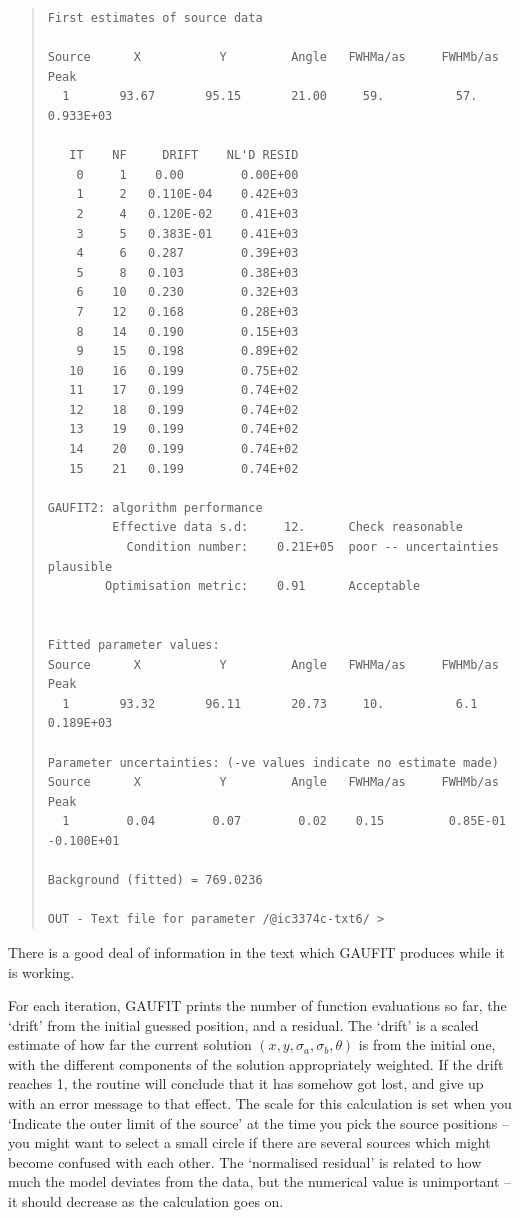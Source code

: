 \documentclass[twoside,11pt]{article}
\newenvironment{myquote}{\begin{quote}\begin{small}}{\end{small}\end{quote}}
\begin{document}
\begin{myquote}
\begin{verbatim}
First estimates of source data

Source      X           Y         Angle   FWHMa/as     FWHMb/as         Peak
  1       93.67       95.15       21.00     59.          57.        0.933E+03

   IT    NF     DRIFT    NL'D RESID
    0     1    0.00        0.00E+00
    1     2   0.110E-04    0.42E+03
    2     4   0.120E-02    0.41E+03
    3     5   0.383E-01    0.41E+03
    4     6   0.287        0.39E+03
    5     8   0.103        0.38E+03
    6    10   0.230        0.32E+03
    7    12   0.168        0.28E+03
    8    14   0.190        0.15E+03
    9    15   0.198        0.89E+02
   10    16   0.199        0.75E+02
   11    17   0.199        0.74E+02
   12    18   0.199        0.74E+02
   13    19   0.199        0.74E+02
   14    20   0.199        0.74E+02
   15    21   0.199        0.74E+02

GAUFIT2: algorithm performance
         Effective data s.d:     12.      Check reasonable
           Condition number:    0.21E+05  poor -- uncertainties plausible
        Optimisation metric:    0.91      Acceptable


Fitted parameter values:
Source      X           Y         Angle   FWHMa/as     FWHMb/as         Peak
  1       93.32       96.11       20.73     10.          6.1        0.189E+03

Parameter uncertainties: (-ve values indicate no estimate made)
Source      X           Y         Angle   FWHMa/as     FWHMb/as         Peak
  1        0.04        0.07        0.02    0.15         0.85E-01   -0.100E+01

Background (fitted) = 769.0236

OUT - Text file for parameter /@ic3374c-txt6/ > 
\end{verbatim}
\end{myquote}

There is a good deal of information in the text which GAUFIT produces
while it is working.

For each iteration, GAUFIT prints the number of function evaluations
so far, the `drift' from the initial guessed position, and a
residual.  The `drift' is a scaled estimate of how far the current
solution $(x,y,\sigma_a,\sigma_b,\theta)$ is from the initial one,
with the different components of the solution appropriately weighted.
If the drift reaches 1, the routine will conclude that it has somehow
got lost, and give up with an error message to that effect. The scale
for this calculation is set when you `Indicate the outer limit of the
source' at the time you pick the source positions -- you might want to
select a small circle if there are several sources which might become
confused with each other.  The `normalised residual' is related to how
much the model deviates from the data, but the numerical value is
unimportant -- it should decrease as the calculation goes on.
\end{document}
